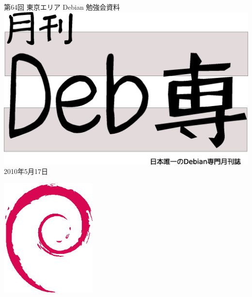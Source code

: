 \documentclass[mingoth,a4paper]{jsarticle}
\newcommand{\debmtgyear}{2010}
\newcommand{\debmtgmonth}{5}
\newcommand{\debmtgdate}{17}
\newcommand{\debmtgnumber}{64}
\begin{document}
\begin{titlepage}
\thispagestyle{empty}


\vspace*{-2cm}
第\debmtgnumber{}回 東京エリア Debian 勉強会資料\\
\hspace*{-2cm}
\includegraphics[width=210mm]{image201003/debsen.eps}\\
\hfill{}\debmtgyear{}年\debmtgmonth{}月\debmtgdate{}日


\vspace*{-2cm}
\hfill{}\includegraphics[height=6cm]{image200502/openlogo-nd.eps}
\end{titlepage}

\end{document}

